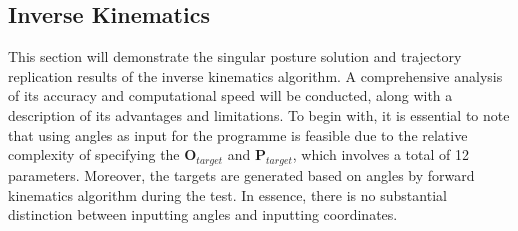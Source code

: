 \subsection{Inverse Kinematics} %
This section will demonstrate the singular posture solution and trajectory replication results of the inverse 
kinematics algorithm. A comprehensive analysis of its accuracy and computational speed will be conducted, along 
with a description of its advantages and limitations. To begin with, it is essential to note that using angles 
as input for the programme is feasible due to the relative complexity of specifying the $\textbf{O}_{target}$ 
and $\textbf{P}_{target}$, which involves a total of 12 parameters. Moreover, the targets are generated based 
on angles by forward kinematics algorithm during the test. In essence, there is no substantial distinction 
between inputting angles and inputting coordinates.
